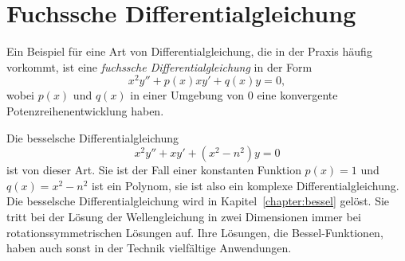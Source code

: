 %
%
%
\section{Fuchssche Differentialgleichung
\label{buch:differentialgleichungen:section:fuchs}}
Ein Beispiel für eine Art von Differentialgleichung, die in der 
Praxis häufig vorkommt, ist eine \emph{fuchssche Differentialgleichung}
in der Form
\begin{equation}
x^2y'' + p(x)xy' + q(x)y = 0,
\label{buch:differentialgleichungen:fuchs:eqn:dgl}
\end{equation}
wobei $p(x)$ und $q(x)$ in einer Umgebung von $0$ eine konvergente
Potenzreihenentwicklung haben.

Die besselsche Differentialgleichung
\begin{equation}
x^2 y'' + xy' + (x^2-n^2) y = 0
\label{buch:differentialgleichungen:fuchs:eqn:besseldgl}
\end{equation}
ist von dieser Art.
Sie ist der Fall einer konstanten Funktion $p(x)=1$ und $q(x)=x^2-n^2$
ist ein Polynom, sie ist also ein komplexe Differentialgleichung.
Die besselsche Differentialgleichung wird in Kapitel~\ref{chapter:bessel}
gelöst.
Sie tritt bei der Lösung der Wellengleichung in zwei Dimensionen
immer bei rotationssymmetrischen Lösungen auf.
Ihre Lösungen, die Bessel-Funktionen, haben auch sonst in der Technik
vielfältige Anwendungen.




